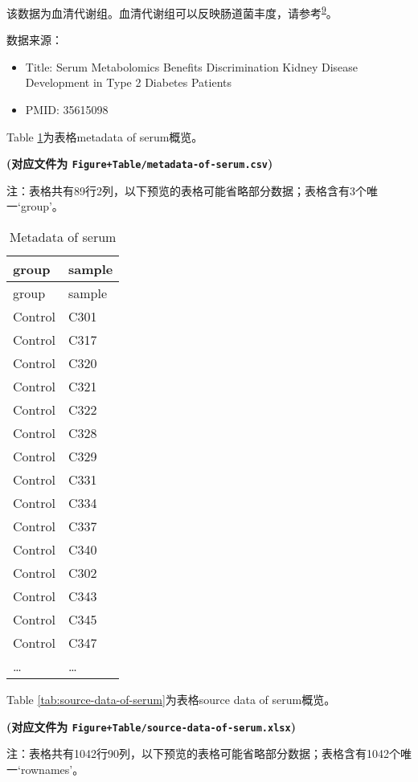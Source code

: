 \documentclass[
]{article}
\providecommand{\tightlist}{%
  \setlength{\itemsep}{0pt}\setlength{\parskip}{0pt}}
\begin{document}
该数据为血清代谢组。血清代谢组可以反映肠道菌丰度，请参考\textsuperscript{\protect\hyperlink{ref-BloodMetabolomWilman2019}{9}}。

数据来源：

\begin{itemize}
\tightlist
\item
  Title: Serum Metabolomics Benefits Discrimination Kidney Disease Development in Type 2 Diabetes Patients
\item
  PMID: 35615098
\end{itemize}

Table \ref{tab:metadata-of-serum}为表格metadata of serum概览。

\textbf{(对应文件为 \texttt{Figure+Table/metadata-of-serum.csv})}

\begin{center}\begin{tcolorbox}[colback=gray!10, colframe=gray!50, width=0.9\linewidth, arc=1mm, boxrule=0.5pt]注：表格共有89行2列，以下预览的表格可能省略部分数据；表格含有3个唯一`group'。
\end{tcolorbox}
\end{center}

\begin{longtable}[]{@{}ll@{}}
\caption{\label{tab:metadata-of-serum}Metadata of serum}\tabularnewline
\toprule
group & sample\tabularnewline
\midrule
\endfirsthead
\toprule
group & sample\tabularnewline
\midrule
\endhead
Control & C301\tabularnewline
Control & C317\tabularnewline
Control & C320\tabularnewline
Control & C321\tabularnewline
Control & C322\tabularnewline
Control & C328\tabularnewline
Control & C329\tabularnewline
Control & C331\tabularnewline
Control & C334\tabularnewline
Control & C337\tabularnewline
Control & C340\tabularnewline
Control & C302\tabularnewline
Control & C343\tabularnewline
Control & C345\tabularnewline
Control & C347\tabularnewline
\ldots{} & \ldots{}\tabularnewline
\bottomrule
\end{longtable}

Table \ref{tab:source-data-of-serum}为表格source data of serum概览。

\textbf{(对应文件为 \texttt{Figure+Table/source-data-of-serum.xlsx})}

\begin{center}\begin{tcolorbox}[colback=gray!10, colframe=gray!50, width=0.9\linewidth, arc=1mm, boxrule=0.5pt]注：表格共有1042行90列，以下预览的表格可能省略部分数据；表格含有1042个唯一`rownames'。
\end{tcolorbox}
\end{center}
\end{document}
